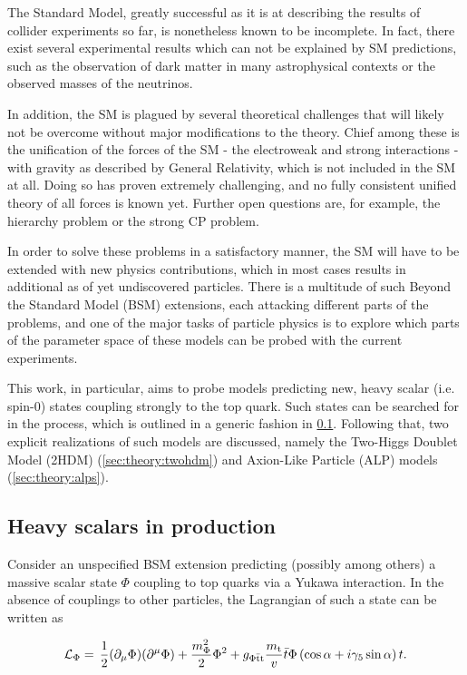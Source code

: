 The Standard Model, greatly successful as it is at describing the results of collider experiments so far, is nonetheless known to be incomplete. In fact, there exist several experimental results which can not be explained by SM predictions, such as the observation of dark matter in many astrophysical contexts or the observed masses of the neutrinos. 

In addition, the SM is plagued by several theoretical challenges that will likely not be overcome without major modifications to the theory. Chief among these is the unification of the forces of the SM - the electroweak and strong interactions - with gravity as described by General Relativity, which is not included in the SM at all. Doing so has proven extremely challenging, and no fully consistent unified theory of all forces is known yet. Further open questions are, for example, the hierarchy problem or the strong CP problem.

In order to solve these problems in a satisfactory manner, the SM will have to be extended with new physics contributions, which in most cases results in additional as of yet undiscovered particles. There is a multitude of such Beyond the Standard Model (BSM) extensions, each attacking different parts of the problems, and one of the major tasks of particle physics is to explore which parts of the parameter space of these models can be probed with the current experiments.

This work, in particular, aims to probe models predicting new, heavy scalar (i.e. spin-0) states coupling strongly to the top quark. Such states can be searched for in the \pptt process, which is outlined in a generic fashion in \cref{sec:theory:ah}. Following that, two explicit realizations of such models are discussed, namely the Two-Higgs Doublet Model (2HDM) (\cref{sec:theory:twohdm}) and Axion-Like Particle (ALP) models (\cref{sec:theory:alps}).

\subsection{Heavy scalars in \ttbartitle production}
\label{sec:theory:ah}

Consider an unspecified BSM extension predicting (possibly among others) a massive scalar state $\Phi$ coupling to top quarks via a Yukawa interaction. In the absence of couplings to other particles, the Lagrangian of such a state can be written as~\cite{Maltoni:2024tul}

\begin{equation}
\label{eq:theory:lag_ah}
    \mathcal{L}_{\Phi} = \, \frac{1}{2} (\partial_\mu \Phi ) (\partial^\mu \Phi ) +\frac{m_{\Phi}^2}{2} \Phi^2 
    + g_{\mathrm{\Phi \bar{t} t}} \frac{m_{\mathrm{t}}}{v} \bar{t} \Phi \left( \cos{\alpha} + i \gamma_5 \sin{\alpha} \right) t .
\end{equation}

